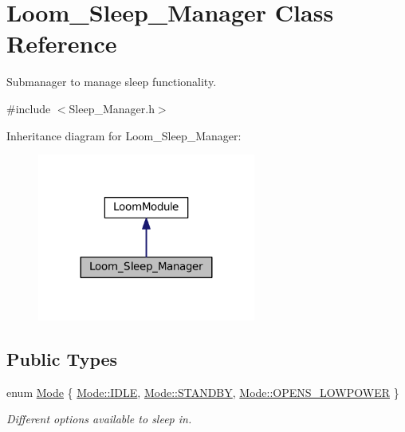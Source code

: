 \hypertarget{class_loom___sleep___manager}{}\section{Loom\+\_\+\+Sleep\+\_\+\+Manager Class Reference}
\label{class_loom___sleep___manager}


Submanager to manage sleep functionality.  




{\ttfamily \#include $<$Sleep\+\_\+\+Manager.\+h$>$}



Inheritance diagram for Loom\+\_\+\+Sleep\+\_\+\+Manager\+:\nopagebreak
\begin{figure}[H]
\begin{center}
\leavevmode
\includegraphics[width=203pt]{class_loom___sleep___manager__inherit__graph}
\end{center}
\end{figure}
\subsection*{Public Types}
\begin{DoxyCompactItemize}
\item 
enum \hyperlink{class_loom___sleep___manager_ab1cb2baaf00c386048490c3787a2de13}{Mode} \{ \hyperlink{class_loom___sleep___manager_ab1cb2baaf00c386048490c3787a2de13aa5daf7f2ebbba4975d61dab1c40188c7}{Mode\+::\+I\+D\+LE}, 
\hyperlink{class_loom___sleep___manager_ab1cb2baaf00c386048490c3787a2de13aeea559d5c56d48e94e586f7fe000c0b1}{Mode\+::\+S\+T\+A\+N\+D\+BY}, 
\hyperlink{class_loom___sleep___manager_ab1cb2baaf00c386048490c3787a2de13ac7cf9ecb707e9328789a3c3a4752f874}{Mode\+::\+O\+P\+E\+N\+S\+\_\+\+L\+O\+W\+P\+O\+W\+ER}
 \}\begin{DoxyCompactList}\small\item\em Different options available to sleep in. \end{DoxyCompactList}
\end{DoxyCompactItemize}
